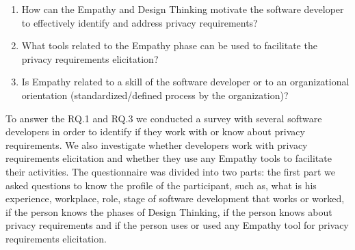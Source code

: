 \documentclass[conference]{IEEEtran}
\begin{document}
\begin{enumerate}[RQ.1:]
    \item How can the Empathy and Design Thinking motivate the software developer to effectively identify and address privacy requirements?
    \item What tools related to the Empathy phase can be used to facilitate the privacy requirements elicitation?
    \item Is Empathy related to a skill of the software developer or to an organizational orientation (standardized/defined process by the organization)?

\end{enumerate}


To answer the RQ.1 and RQ.3 we conducted a survey with several software developers in order to identify if they work with or know about privacy requirements. We also investigate whether developers work with privacy requirements elicitation and whether they use any Empathy tools to facilitate their activities. The questionnaire was divided into two parts: the first part we asked questions to know the profile of the participant, such as, what is his experience, workplace, role, stage of software development that works or worked, if the person knows the phases of Design Thinking, if the person knows about privacy requirements and if the person uses or used any Empathy tool for privacy requirements elicitation.
\end{document}
